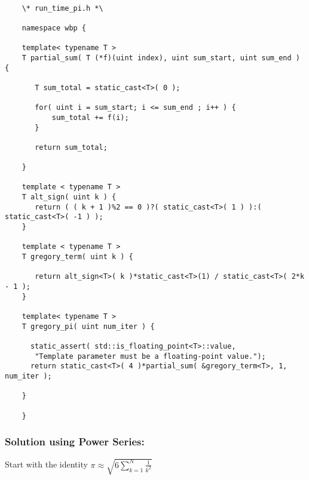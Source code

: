 \documentclass[letterpaper,11pt]{article}
\begin{document}
\begin{verbatim}

    \* run_time_pi.h *\

    namespace wbp {

    template< typename T >
    T partial_sum( T (*f)(uint index), uint sum_start, uint sum_end ) {

       T sum_total = static_cast<T>( 0 );

       for( uint i = sum_start; i <= sum_end ; i++ ) {
           sum_total += f(i);
       }

       return sum_total;

    }

    template < typename T >
    T alt_sign( uint k ) {
       return ( ( k + 1 )%2 == 0 )?( static_cast<T>( 1 ) ):( static_cast<T>( -1 ) );
    }

    template < typename T >
    T gregory_term( uint k ) {

       return alt_sign<T>( k )*static_cast<T>(1) / static_cast<T>( 2*k - 1 );
    }

    template< typename T >
    T gregory_pi( uint num_iter ) {

      static_assert( std::is_floating_point<T>::value,
       "Template parameter must be a floating-point value.");
      return static_cast<T>( 4 )*partial_sum( &gregory_term<T>, 1, num_iter );

    }

    }
\end{verbatim}

\subsubsection*{Solution using Power Series:}
Start with the identity $\pi \approx \sqrt{ 6 \sum_{k=1}^{N} \frac{1}{k^2} }$
\end{document}
